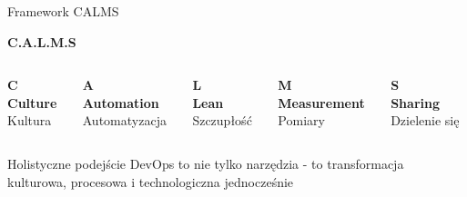 \documentclass[10pt, aspectratio=169]{beamer}
\begin{document}
\begin{frame}{Framework CALMS}
\begin{center}
\Large\textbf{C.A.L.M.S}
\end{center}

\begin{columns}[T]
\begin{column}{0.2\textwidth}
\centering
\textcolor{IBMBlue}{\textbf{\Large C}}\\
\textbf{Culture}\\
\small Kultura
\end{column}
\begin{column}{0.2\textwidth}
\centering
\textcolor{IBMBlue}{\textbf{\Large A}}\\
\textbf{Automation}\\
\small Automatyzacja
\end{column}
\begin{column}{0.2\textwidth}
\centering
\textcolor{IBMBlue}{\textbf{\Large L}}\\
\textbf{Lean}\\
\small Szczupłość
\end{column}
\begin{column}{0.2\textwidth}
\centering
\textcolor{IBMBlue}{\textbf{\Large M}}\\
\textbf{Measurement}\\
\small Pomiary
\end{column}
\begin{column}{0.2\textwidth}
\centering
\textcolor{IBMBlue}{\textbf{\Large S}}\\
\textbf{Sharing}\\
\small Dzielenie się
\end{column}
\end{columns}

\vspace{1cm}
\begin{block}{Holistyczne podejście}
DevOps to nie tylko narzędzia - to transformacja kulturowa, procesowa i technologiczna jednocześnie
\end{block}
\end{frame}
\end{document}
